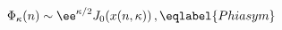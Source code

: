 \begin{equation}
\Phi_\kappa(n) \sim \ee^{\kappa/2} J_0(x(n,\kappa)) \,,
\eqlabel{Phiasym}
\end{equation}

